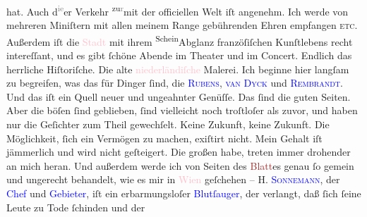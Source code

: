                hat. Auch d\substVorne{}\textsuperscript{\textcolor{gray}{ie}}\substDazwischen{}er\substHinten{} Verkehr \substVorne{}\textsuperscript{zu\textcolor{gray}{r}}\substDazwischen{}mit der\substHinten{} officiellen Welt iſt angenehm. Ich werde von mehreren Miniſtern mit allen
               meinem Range gebührenden Ehren empfangen \textsc{etc.} Außerdem iſt
               die \textcolor{pink}{Stadt}{} mit ihrem \substVorne{}\textsuperscript{Schein}{\allowbreak}\substDazwischen{}Abglanz\substHinten{} franzöſiſchen Kunſtlebens recht intereſſant, und es gibt ſchöne Abende im
               Theater und im Concert. Endlich das herrliche Hiſtoriſche. Die alte \textcolor{pink}{niederländiſche}{}\ledrightnote{\textcolor{pink}{Niederlande}} Malerei. Ich beginne hier langſam zu
               begreifen, was das für Dinger ſind, die \textsc{\textcolor{blue}{Rubens}{}\ledrightnote{\textcolor{blue}{Peter Paul Rubens}}}, \textsc{\textcolor{blue}{van Dyck}{}\ledrightnote{\textcolor{blue}{Anthonis van Dyck}}} und \textsc{\textcolor{blue}{Rembrandt}{}\ledrightnote{\textcolor{blue}{Rembrandt van Rijn}}}. Und das iſt ein Quell neuer und {\pb}ungeahnter
               Genüſſe.\pend
           \pstart
           Das ſind die guten Seiten. Aber die böſen ſind geblieben, ſind vielleicht noch
               troſtloſer als zuvor, und haben nur die Geſichter zum Theil gewechſelt. Keine
               Zukunft, keine Zukunft. Die Möglichkeit, ſich ein Vermögen zu machen, exiſtirt nicht.
               Mein Gehalt iſt jämmerlich und wird nicht geſteigert. Die großen \label{K_L02669-999v}\label{K_L02669-999h} habe, treten immer drohender an mich heran. Und außerdem werde ich von Seiten
               des \textcolor{brown}{Blatt}{}es genau ſo gemein und
               ungerecht behandelt, wie es mir in \textcolor{pink}{Wien}{}\ledrightnote{\textcolor{pink}{Wien}} geſchehen
               – H. \textsc{\textcolor{blue}{Sonnemann}{}\ledrightnote{\textcolor{blue}{Leopold Sonnemann}}}, der \textcolor{blue}{Chef}{} und \textcolor{blue}{Gebieter}{}, iſt ein \strikeout{\textcolor{gray}{erbarmu}} erbarmungsloſer \textcolor{blue}{Blutſauger}{}, der verlangt, daß ſich ſeine Leute zu Tode ſchinden und der
